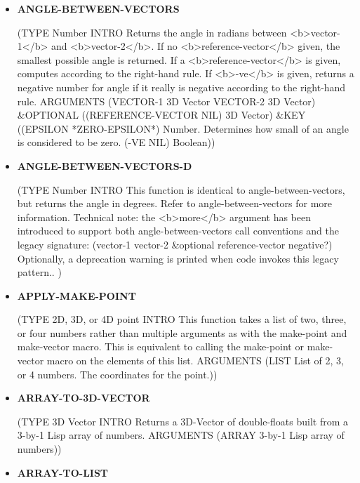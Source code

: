 \documentclass [11pt]{book}
\begin{document}
\begin{itemize}
\item {}
\label{prim:angle-between-vectors}
\textbf{ANGLE-BETWEEN-VECTORS}

(TYPE Number INTRO  Returns the angle in radians between <b>vector-1</b> and <b>vector-2</b>.
If no <b>reference-vector</b> given, the smallest possible angle is returned.
If a <b>reference-vector</b> is given, computes according to the right-hand rule.
If <b>-ve</b> is given,  returns a negative number for angle if it really is
negative according to the right-hand rule.
 ARGUMENTS (VECTOR-1 3D Vector VECTOR-2 3D Vector) \&OPTIONAL ((REFERENCE-VECTOR NIL) 3D Vector) \&KEY ((EPSILON *ZERO-EPSILON*) Number. Determines how small of an angle is considered to be zero. (-VE NIL) Boolean))



\item {}
\label{prim:angle-between-vectors-d}
\textbf{ANGLE-BETWEEN-VECTORS-D}

(TYPE Number INTRO  This function is identical to angle-between-vectors, but returns the angle in degrees.
Refer to angle-between-vectors for more information.
Technical note: the <b>more</b> argument has been introduced to support both
angle-between-vectors call conventions and the legacy signature:
(vector-1 vector-2 \&optional reference-vector negative?)
Optionally, a deprecation warning is printed when code invokes this legacy pattern..
)



\item {}
\label{prim:apply-make-point}
\textbf{APPLY-MAKE-POINT}

(TYPE 2D, 3D, or 4D point INTRO  This function takes a list of two, three, or four numbers rather
than multiple arguments as with the make-point and make-vector macro. This is equivalent
to calling the make-point or make-vector macro on the elements of this list.
 ARGUMENTS (LIST List of 2, 3, or 4 numbers. The coordinates for the point.))



\item {}
\label{prim:array-to-3d-vector}
\textbf{ARRAY-TO-3D-VECTOR}

(TYPE 3D Vector INTRO  Returns a 3D-Vector of double-floats built from a 3-by-1 Lisp array of numbers.
 ARGUMENTS (ARRAY 3-by-1 Lisp array of numbers))



\item {}
\label{prim:array-to-list}
\textbf{ARRAY-TO-LIST}


\end{itemize}
\end{document}
